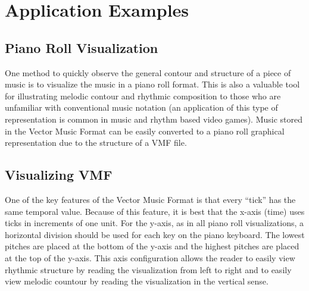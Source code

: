 
\section{Application Examples}

\subsection{Piano Roll Visualization}

One method to quickly observe the general contour and structure of a piece of music is to visualize the music in a piano roll format. This is also a valuable tool for illustrating melodic contour and rhythmic composition to those who are unfamiliar with conventional music notation (an application of this type of representation is common in music and rhythm based video games). Music stored in the Vector Music Format can be easily converted to a piano roll graphical representation due to the structure of a VMF file.

\subsection{Visualizing VMF}

One of the key features of the Vector Music Format is that every ``tick'' has the same temporal value. Because of this feature, it is best that the x-axis (time) uses ticks in increments of one unit. For the y-axis, as in all piano roll visualizations, a horizontal division should be used for each key on the piano keyboard. The lowest pitches are placed at the bottom of the y-axis and the highest pitches are placed at the top of the y-axis. This axis configuration allows the reader to easily view rhythmic structure by reading the visualization from left to right and to easily view melodic countour by reading the visualization in the vertical sense.

